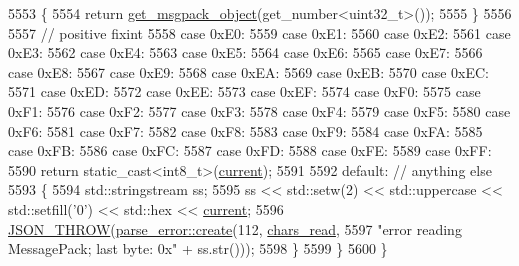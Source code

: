 \begin{DoxyCode}
5553             \{
5554                 \textcolor{keywordflow}{return} \hyperlink{classnlohmann_1_1detail_1_1binary__reader_a8fd9972d8bbb03b49acbaaf641151859}{get\_msgpack\_object}(get\_number<uint32\_t>());
5555             \}
5556 
5557             \textcolor{comment}{// positive fixint}
5558             \textcolor{keywordflow}{case} 0xE0:
5559             \textcolor{keywordflow}{case} 0xE1:
5560             \textcolor{keywordflow}{case} 0xE2:
5561             \textcolor{keywordflow}{case} 0xE3:
5562             \textcolor{keywordflow}{case} 0xE4:
5563             \textcolor{keywordflow}{case} 0xE5:
5564             \textcolor{keywordflow}{case} 0xE6:
5565             \textcolor{keywordflow}{case} 0xE7:
5566             \textcolor{keywordflow}{case} 0xE8:
5567             \textcolor{keywordflow}{case} 0xE9:
5568             \textcolor{keywordflow}{case} 0xEA:
5569             \textcolor{keywordflow}{case} 0xEB:
5570             \textcolor{keywordflow}{case} 0xEC:
5571             \textcolor{keywordflow}{case} 0xED:
5572             \textcolor{keywordflow}{case} 0xEE:
5573             \textcolor{keywordflow}{case} 0xEF:
5574             \textcolor{keywordflow}{case} 0xF0:
5575             \textcolor{keywordflow}{case} 0xF1:
5576             \textcolor{keywordflow}{case} 0xF2:
5577             \textcolor{keywordflow}{case} 0xF3:
5578             \textcolor{keywordflow}{case} 0xF4:
5579             \textcolor{keywordflow}{case} 0xF5:
5580             \textcolor{keywordflow}{case} 0xF6:
5581             \textcolor{keywordflow}{case} 0xF7:
5582             \textcolor{keywordflow}{case} 0xF8:
5583             \textcolor{keywordflow}{case} 0xF9:
5584             \textcolor{keywordflow}{case} 0xFA:
5585             \textcolor{keywordflow}{case} 0xFB:
5586             \textcolor{keywordflow}{case} 0xFC:
5587             \textcolor{keywordflow}{case} 0xFD:
5588             \textcolor{keywordflow}{case} 0xFE:
5589             \textcolor{keywordflow}{case} 0xFF:
5590                 \textcolor{keywordflow}{return} \textcolor{keyword}{static\_cast<}int8\_t\textcolor{keyword}{>}(\hyperlink{classnlohmann_1_1detail_1_1binary__reader_a7e994e201b215cd6d6ae28a1853f43e0}{current});
5591 
5592             \textcolor{keywordflow}{default}: \textcolor{comment}{// anything else}
5593             \{
5594                 std::stringstream ss;
5595                 ss << std::setw(2) << std::uppercase << std::setfill(\textcolor{charliteral}{'0'}) << std::hex << 
      \hyperlink{classnlohmann_1_1detail_1_1binary__reader_a7e994e201b215cd6d6ae28a1853f43e0}{current};
5596                 \hyperlink{json_8hpp_a6c274f6db2e65c1b66c7d41b06ad690f}{JSON\_THROW}(\hyperlink{classnlohmann_1_1detail_1_1parse__error_a9fd60ad6bce80fd99686ad332faefd37}{parse\_error::create}(112, 
      \hyperlink{classnlohmann_1_1detail_1_1binary__reader_a2dbde0b7390100efe0bfc54e21c3a34b}{chars\_read},
5597                                                \textcolor{stringliteral}{"error reading MessagePack; last byte: 0x"} + ss.str()));
5598             \}
5599         \}
5600     \}
\end{DoxyCode}
